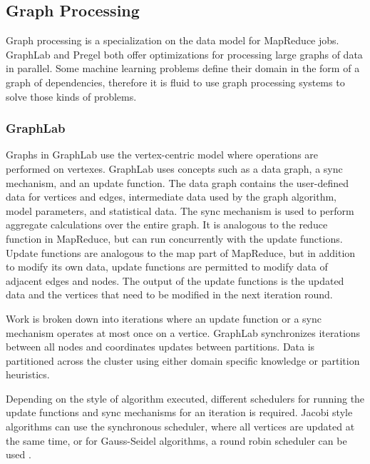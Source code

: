 \documentclass[12pt]{article}
\begin{document}
\subsection{Graph Processing}

Graph processing is a specialization on the data model for MapReduce jobs. GraphLab \cite{low2012graphlab} and Pregel \cite{malewicz2010pregel} both offer optimizations for processing large graphs of data in parallel. Some machine learning problems define their domain in the form of a graph of dependencies, therefore it is fluid to use graph processing systems to solve those kinds of problems.


\subsubsection{GraphLab}

Graphs in GraphLab \cite{low2012graphlab} use the vertex-centric model where operations are performed on vertexes. GraphLab uses concepts such as a data graph, a sync mechanism, and an update function. The data graph contains the user-defined data for vertices and edges, intermediate data used by the graph algorithm, model parameters, and statistical data. The sync mechanism is used to perform aggregate calculations over the entire graph. It is analogous to the reduce function in MapReduce, but can run concurrently with the update functions. Update functions are analogous to the map part of MapReduce, but in addition to modify its own data, update functions are permitted to modify data of adjacent edges and nodes. The output of the update functions is the updated data and the vertices that need to be modified in the next iteration round.

Work is broken down into iterations where an update function or a sync mechanism operates at most once on a vertice. GraphLab synchronizes iterations between all nodes and coordinates updates between partitions. Data is partitioned across the cluster using either domain specific knowledge or partition heuristics.

Depending on the style of algorithm executed, different schedulers for running the update functions and sync mechanisms for an iteration is required. Jacobi style algorithms can use the synchronous scheduler, where all vertices are updated at the same time, or for Gauss-Seidel algorithms, a round robin scheduler can be used \cite{zhang2016survey}.
\end{document}
